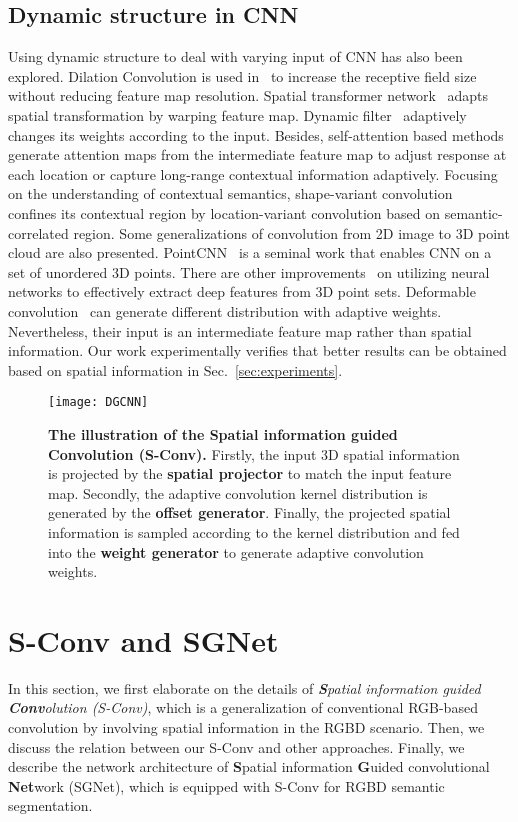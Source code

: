 \documentclass[journal]{IEEEtran}
\newcommand{\secref}[1]{Sec.~\ref{#1}}
\begin{document}
\subsection{Dynamic structure in CNN}
Using dynamic structure
to deal with varying input of CNN has also been explored.
Dilation Convolution is used in~\cite{multi, deeplab} to increase the receptive
field size without reducing feature map resolution.
Spatial transformer network~\cite{stn} adapts spatial transformation
by warping feature map.
Dynamic filter~\cite{dynamicfilter} adaptively 
changes its weights according to the input.
Besides, self-attention based methods~\cite{selective, nonlocal, senet, svconv} 
generate attention maps from the intermediate feature map to adjust response
at each location or capture long-range contextual information
adaptively. 
Focusing on the understanding of contextual semantics, shape-variant convolution ~\cite{svconv} confines its contextual region 
by location-variant convolution based on semantic-correlated region.
Some generalizations of convolution from 2D image 
to 3D point cloud are also presented. PointCNN~\cite{pointcnn} is a seminal work that enables CNN on a set of unordered 3D points. 
There are other improvements~\cite{chen2019lsanet,spidercnn,spectral_graph_conv} 
on utilizing neural networks to effectively extract deep features from 3D point sets.
Deformable convolution~\cite{deform,deformablev2}
can generate different distribution with adaptive weights.
Nevertheless, their input is an intermediate feature map rather than
spatial information.
Our work experimentally verifies that better results can be obtained
based on spatial information in \secref{sec:experiments}.



\begin{figure*}[htbp]
	\centering
	\texttt{[image: DGCNN]}
	\caption{\textbf{The illustration of the Spatial information 
		guided Convolution (S-Conv).} 
		Firstly, the input 3D spatial information is projected 
		by the \textbf{spatial projector}
		to match the input feature map.
Secondly, the adaptive convolution
		kernel distribution is generated by the \textbf{offset generator}.
Finally, the projected spatial information is sampled according
		to the kernel distribution and fed into the \textbf{weight generator}
		to generate adaptive convolution weights.}
	\label{fig:sconv}
\end{figure*}
\section{S-Conv and SGNet}
\label{sec:method}
In this section, we first elaborate on the details of 
\emph{\textbf{S}patial information guided \textbf{Conv}olution (S-Conv)},
which is a generalization of conventional 
RGB-based convolution by involving spatial
information in the RGBD scenario.
Then, we discuss the relation between our S-Conv and other approaches.
Finally, we describe the network architecture of 
\textbf{S}patial information \textbf{G}uided convolutional 
\textbf{Net}work (SGNet), which is equipped
with S-Conv for RGBD semantic segmentation.
\end{document}
